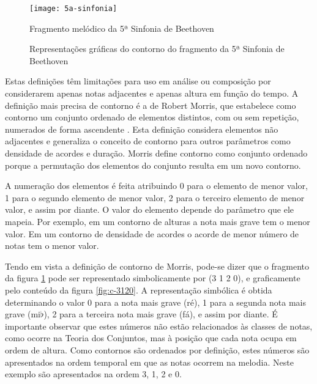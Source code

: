 \begin{figure}
  \centering
  \texttt{[image: 5a-sinfonia]}
  \caption{Fragmento melódico da 5ª Sinfonia de Beethoven}
  \label{fig:5a-sinfonia}
\end{figure}

\begin{figure}
  \centering
  \subfloat[(- + -)]{
    \texttt{[image: c-1010]}
    \label{fig:c-1010}
  }
  \quad
  \subfloat[(3 1 2 0)]{
    \texttt{[image: c-3120]}
    \label{fig:c-3120}
  }
  \caption{Representações gráficas do contorno do fragmento da 5ª
    Sinfonia de Beethoven}
  \label{fig:repr-5a-sinfonia}
\end{figure}

Estas definições têm limitações para uso em análise ou composição por
considerarem apenas notas adjacentes e apenas altura em função do
tempo. A definição mais precisa de contorno é a de Robert Morris, que
estabelece como contorno um conjunto ordenado de elementos distintos,
com ou sem repetição, numerados de forma ascendente
\cite[p. 206]{morris93:directions}. Esta definição considera elementos
não adjacentes e generaliza o conceito de contorno para outros
parâmetros como densidade de acordes e duração. Morris define contorno
como conjunto ordenado porque a permutação dos elementos do conjunto
resulta em um novo contorno.

A numeração dos elementos é feita atribuindo 0 para o elemento de
menor valor, 1 para o segundo elemento de menor valor, 2 para o
terceiro elemento de menor valor, e assim por diante. O valor do
elemento depende do parâmetro que ele mapeia. Por exemplo, em um
contorno de alturas a nota mais grave tem o menor valor. Em um
contorno de densidade de acordes o acorde de menor número de notas
tem o menor valor.

Tendo em vista a definição de contorno de Morris, pode-se dizer que o
fragmento da figura \ref{fig:5a-sinfonia} pode ser representado
simbolicamente por (3 1 2 0), e graficamente pelo conteúdo da figura
\ref{fig:c-3120}. A representação simbólica é obtida determinando o
valor 0 para a nota mais grave (ré), 1 para a segunda nota mais grave
(mi$\flat$), 2 para a terceira nota mais grave (fá), e assim por
diante. É importante observar que estes números não estão relacionados
às classes de notas, como ocorre na Teoria dos Conjuntos, mas à
posição que cada nota ocupa em ordem de altura. Como contornos são
ordenados por definição, estes números são apresentados na ordem
temporal em que as notas ocorrem na melodia. Neste exemplo são
apresentados na ordem 3, 1, 2 e 0.


